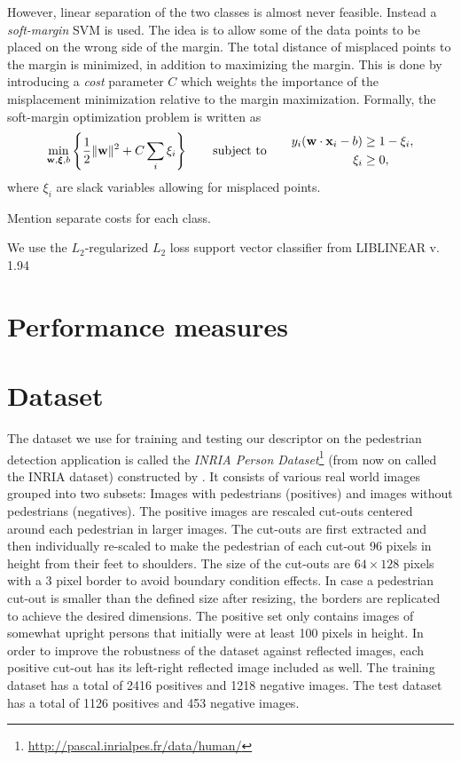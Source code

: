 \documentclass[thesis.tex]{subfiles}
\begin{document}
However, linear separation of the two classes is almost never feasible. Instead a \emph{soft-margin} SVM is used. The idea is to allow some of the data points to be placed on the wrong side of the margin. The total distance of misplaced points to the margin is minimized, in addition to maximizing the margin. This is done by introducing a \emph{cost} parameter $C$ which weights the importance of the misplacement minimization relative to the margin maximization. Formally, the soft-margin optimization problem is written as
%
\begin{align*}
\min_{\mathbf{w},\boldsymbol{\xi},b} \left\{ \frac12 \| \mathbf{w} \|^2 + C \sum_i \xi_i \right\} \qquad \text{subject to} \qquad \begin{aligned} y_i (\mathbf{w} \cdot \mathbf{x}_i - b) &\geq 1 - \xi_i, \\ \xi_i &\geq 0, \end{aligned}
\end{align*}
%
where $\xi_i$ are slack variables allowing for misplaced points.

Mention separate costs for each class.

We use the $L_2$-regularized $L_2$ loss support vector classifier from LIBLINEAR v. 1.94 \cite{fan2008liblinear}

\section{Performance measures}

\section{Dataset}
\label{sec:odDataset}

The dataset we use for training and testing our descriptor on the pedestrian detection application is called the \emph{INRIA Person Dataset}\footnote{\url{http://pascal.inrialpes.fr/data/human/}} (from now on called the INRIA dataset) constructed by \citet{dalal2005histograms}.
It consists of various real world images grouped into two subsets: Images with pedestrians (positives) and images without pedestrians (negatives). The positive images are rescaled cut-outs centered around each pedestrian in larger images. The cut-outs are first extracted and then individually re-scaled to make the pedestrian of each cut-out 96 pixels in height from their feet to shoulders. The size of the cut-outs are $64 \times 128$ pixels with a 3 pixel border to avoid boundary condition effects. In case a pedestrian cut-out is smaller than the defined size after resizing, the borders are replicated to achieve the desired dimensions.
The positive set only contains images of somewhat upright persons that initially were at least 100 pixels in height. In order to improve the robustness of the dataset against reflected images, each positive cut-out has its left-right reflected image included as well.
The training dataset has a total of 2416 positives and 1218 negative images.
The test dataset has a total of 1126 positives and 453 negative images.
\end{document}
